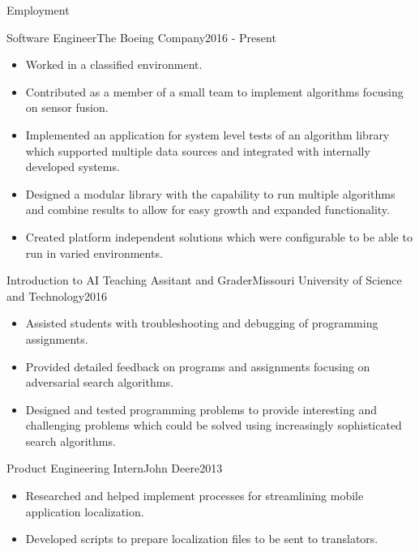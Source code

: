 \documentclass[]{mcdowellcv}
\begin{document}
    \makeheader
    
    \begin{cvsection}{Employment}

        \begin{cvsubsection}{Software Engineer}{The Boeing Company}{2016 - Present}         
            \begin{itemize}
                \item Worked in a classified environment.
                \item Contributed as a member of a small team to implement algorithms focusing on sensor fusion.
                \item Implemented an application for system level tests of an algorithm library which supported multiple data sources and integrated with internally developed systems. 
                \item Designed a modular library with the capability to run multiple algorithms and combine results to allow for easy growth and expanded functionality.
                \item Created platform independent solutions which were configurable to be able to run in varied environments.
            \end{itemize}
        \end{cvsubsection}
        
        \begin{cvsubsection}[2]{Introduction to AI Teaching Assitant and Grader}{Missouri University of Science and Technology}{2016}   
            \begin{itemize}
                \item Assisted students with troubleshooting and debugging of programming assignments.
                \item Provided detailed feedback on programs and assignments focusing on adversarial search algorithms.
                \item Designed and tested programming problems to provide interesting and challenging problems which could be solved using increasingly sophisticated search algorithms.
            \end{itemize}
        \end{cvsubsection}

        \begin{cvsubsection}{Product Engineering Intern}{John Deere}{2013}
            \begin{itemize}
                \item Researched and helped implement processes for streamlining mobile application localization.
                \item Developed scripts to prepare localization files to be sent to translators.
            \end{itemize}
        \end{cvsubsection}
        

\end{cvsection}
\end{document}
